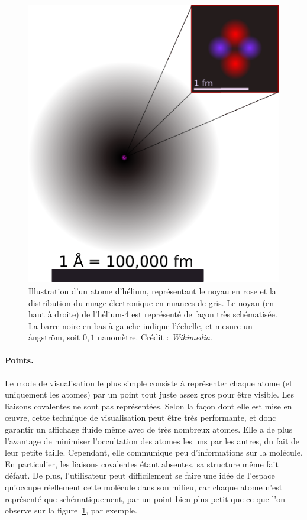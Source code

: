 	\begin{figure}[htb]
		\centering
		\includegraphics[width=\textwidth]{figures/ch1/helium}
		\caption{Illustration d'un atome d'hélium, représentant le noyau en rose et la distribution du nuage électronique en nuances de gris. Le noyau (en haut à droite) de l'hélium-4 est représenté de façon très schématisée. La barre noire en bas à gauche indique l'échelle, et mesure un \aa{}ngström, soit $0,1$ nanomètre. Crédit : \emph{Wikimedia}.}
		\label{fig:helium}
	\end{figure}
	
	\paragraph{Points.} Le mode de visualisation le plus simple consiste à représenter chaque atome (et uniquement les atomes) par un point tout juste assez gros pour être visible. Les liaisons covalentes ne sont pas représentées. Selon la façon dont elle est mise en œuvre, cette technique de visualisation peut être très performante, et donc garantir un affichage fluide même avec de très nombreux atomes. Elle a de plus l'avantage de minimiser l'occultation des atomes les uns par les autres, du fait de leur petite taille. Cependant, elle communique peu d'informations sur la molécule. En particulier, les liaisons covalentes étant absentes, sa structure même fait défaut. De plus, l'utilisateur peut difficilement se faire une idée de l'espace qu'occupe réellement cette molécule dans son milieu, car chaque atome n'est représenté que schématiquement, par un point bien plus petit que ce que l'on observe sur la figure~\ref{fig:helium}, par exemple.
		
